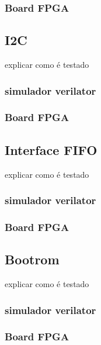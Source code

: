 \subsubsection{Board FPGA}

\subsection{I2C}

explicar como é testado

\subsubsection{simulador verilator}

\subsubsection{Board FPGA}

\subsection{Interface FIFO}

explicar como é testado

\subsubsection{simulador verilator}

\subsubsection{Board FPGA}

\subsection{Bootrom}

explicar como é testado

\subsubsection{simulador verilator}

\subsubsection{Board FPGA}
